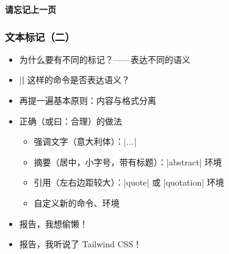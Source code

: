 \begin{frame}[standout]
  \huge \textbf{请忘记上一页}
\end{frame}

\begin{frame}[fragile]
\frametitle{文本标记（二）}
\begin{itemize}
  \item 为什么要有不同的标记？\pause\mbox{}——表达不同的\alert{语义} \pause
  \item |\textbf| 这样的命令是否表达语义？ \pause
  \item 再提一遍基本原则：\alert{内容与格式分离} \pause
  \item 正确（或曰：合理）的做法

    \begin{itemize}
      \item 强调文字（意大利体）：|\emph{...}|
      \item 摘要（居中，小字号，带有标题）：|abstract| 环境
      \item 引用（左右边距较大）：|quote| 或 |quotation| 环境
      \item 自定义新的命令、环境
    \end{itemize} \pause

  \item 报告，我想偷懒！
  \item 报告，我听说了 Tailwind CSS！
\end{itemize}
\end{frame}

